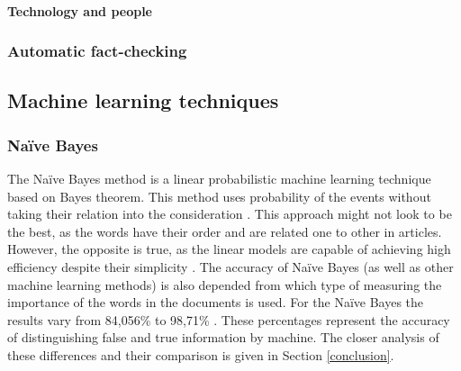 \documentclass[11pt ,english,a4paper]{article}
\begin{document}
\paragraph{Technology and people}%

\subsubsection{Automatic fact-checking}\label{tech:fact:auto}
\cite{gu22fact}

\subsection{Machine learning techniques} \label{tech:mach}



\subsubsection{Naïve Bayes}\label{nb}
The Naïve Bayes method is a linear probabilistic machine learning technique based on Bayes theorem. This method uses probability of the events without taking their relation into the consideration \cite{sha20mach}. This approach might not look to be the best, as the words have their order and are related one to other in articles. However, the opposite is true, as the linear models are capable of achieving high efficiency despite their simplicity \cite{pod19mach}. The accuracy of Naïve Bayes (as well as other machine learning methods) is also depended from which type of measuring the importance of the words in the documents is used. For the Naïve Bayes the results vary from 84,056\% \cite{sha20mach} to 98,71\% \cite{bar21health}. These percentages represent the accuracy of distinguishing false and true information by machine. The closer analysis of these differences and their comparison is given in Section \ref{conclusion}.
\end{document}
